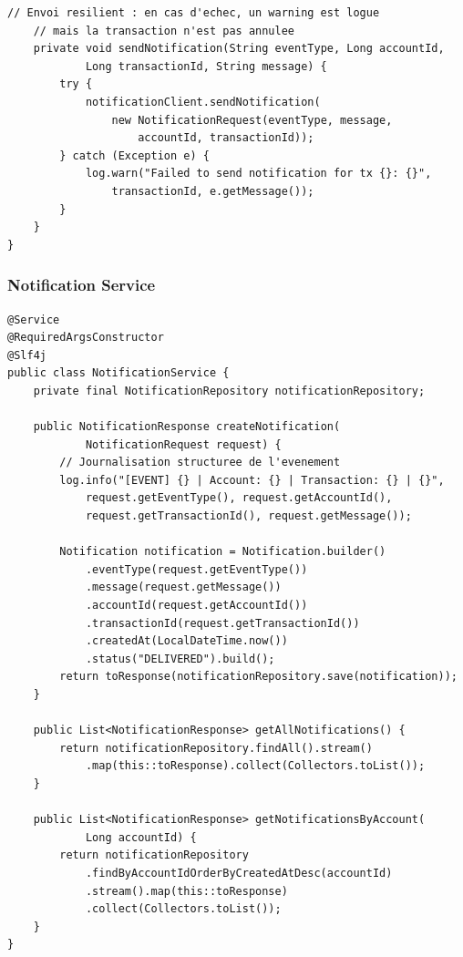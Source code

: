\documentclass[12pt,a4paper]{article}
\begin{document}
\begin{lstlisting}[style=javastyle, caption={TransactionService.java --- Logique du virement (extrait)}, label=lst:txnsvc]
    // Envoi resilient : en cas d'echec, un warning est logue
    // mais la transaction n'est pas annulee
    private void sendNotification(String eventType, Long accountId,
            Long transactionId, String message) {
        try {
            notificationClient.sendNotification(
                new NotificationRequest(eventType, message,
                    accountId, transactionId));
        } catch (Exception e) {
            log.warn("Failed to send notification for tx {}: {}",
                transactionId, e.getMessage());
        }
    }
}
\end{lstlisting}

\subsubsection{Notification Service}

\begin{lstlisting}[style=javastyle, caption={NotificationService.java --- Journalisation des événements}, label=lst:notifsvc]
@Service
@RequiredArgsConstructor
@Slf4j
public class NotificationService {
    private final NotificationRepository notificationRepository;

    public NotificationResponse createNotification(
            NotificationRequest request) {
        // Journalisation structuree de l'evenement
        log.info("[EVENT] {} | Account: {} | Transaction: {} | {}",
            request.getEventType(), request.getAccountId(),
            request.getTransactionId(), request.getMessage());

        Notification notification = Notification.builder()
            .eventType(request.getEventType())
            .message(request.getMessage())
            .accountId(request.getAccountId())
            .transactionId(request.getTransactionId())
            .createdAt(LocalDateTime.now())
            .status("DELIVERED").build();
        return toResponse(notificationRepository.save(notification));
    }

    public List<NotificationResponse> getAllNotifications() {
        return notificationRepository.findAll().stream()
            .map(this::toResponse).collect(Collectors.toList());
    }

    public List<NotificationResponse> getNotificationsByAccount(
            Long accountId) {
        return notificationRepository
            .findByAccountIdOrderByCreatedAtDesc(accountId)
            .stream().map(this::toResponse)
            .collect(Collectors.toList());
    }
}
\end{lstlisting}
\end{document}

